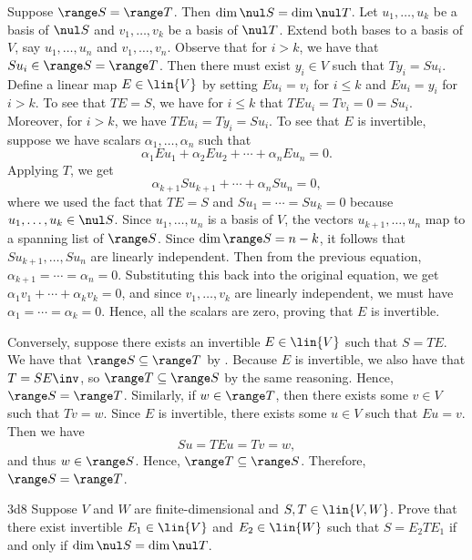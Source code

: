 \begin{sol}
    Suppose $\range S = \range T$.
	Then $\dim \nul S = \dim \nul T$.
	Let $u_1, \ldots, u_k$ be a basis of $\nul S$ and $v_1, \ldots, v_k$ be a basis of $\nul T$.
	Extend both bases to a basis of $V$, say $u_1, \ldots, u_n$ and $v_1, \ldots, v_n$.
	Observe that for $i > k$, we have that $Su_i \in \range S = \range T$.
	Then there must exist $y_i \in V$ such that $Ty_i = Su_i$.
	Define a linear map $E \in \lin{V}$ by setting $Eu_i = v_i$ for $i \leq k$ and $Eu_i = y_i$ for $i > k$.
	To see that $TE = S$, we have for $i \leq k$ that $TEu_i = Tv_i = 0 = Su_i$.
	Moreover, for $i > k$, we have $TEu_i = Ty_i = Su_i$.
	To see that $E$ is invertible, suppose we have scalars $\alpha_1, \ldots, \alpha_n$ such that
    \[
    	\alpha_1 Eu_1 + \alpha_2 Eu_2 + \cdots + \alpha_n Eu_n = 0.
    \]
    Applying $T$, we get
    \[
    	\alpha_{k + 1} Su_{k + 1} + \cdots + \alpha_n Su_n = 0,
    \]
    where we used the fact that $TE = S$ and $Su_1 = \cdots = Su_k = 0$ because $u_1, \ldots, u_k \in \nul S$.
	Since $u_1, \ldots, u_n$ is a basis of $V$, the vectors $u_{k + 1}, \ldots, u_n$ map to a spanning list of $\range S$.
	Since $\dim \range S = n - k$, it follows that $Su_{k + 1}, \ldots, Su_n$ are linearly independent.
	Then from the previous equation, $\alpha_{k + 1} = \cdots = \alpha_n = 0$.
	Substituting this back into the original equation, we get $\alpha_1 v_1 + \cdots + \alpha_k v_k = 0$, and since $v_1, \ldots, v_k$ are linearly independent, we must have $\alpha_1 = \cdots = \alpha_k = 0$.
	Hence, all the scalars are zero, proving that $E$ is invertible.

    Conversely, suppose there exists an invertible $E \in \lin{V}$ such that $S = TE$.
	We have that $\range S \subseteq \range T$ by .
    Because $E$ is invertible, we also have that $T = SE\inv$, so $\range T \subseteq \range S$ by the same reasoning.
    Hence, $\range S = \range T$.
	Similarly, if $w \in \range T$, then there exists some $v \in V$ such that $Tv = w$.
	Since $E$ is invertible, there exists some $u \in V$ such that $Eu = v$.
	Then we have
    \[
    	Su = TEu = Tv = w,
    \]
    and thus $w \in \range S$.
	Hence, $\range T \subseteq \range S$.
	Therefore, $\range S = \range T$.
\end{sol}

\begin{exercise}{3d8}
    Suppose $V$ and $W$ are finite-dimensional and $S, T \in \lin{V, W}$.
	Prove that there exist invertible $E_1 \in \lin{V}$ and $E_2 \in \lin{W}$ such that $S = E_2 T E_1$ if and only if $\dim \nul S = \dim \nul T$.
\end{exercise}

